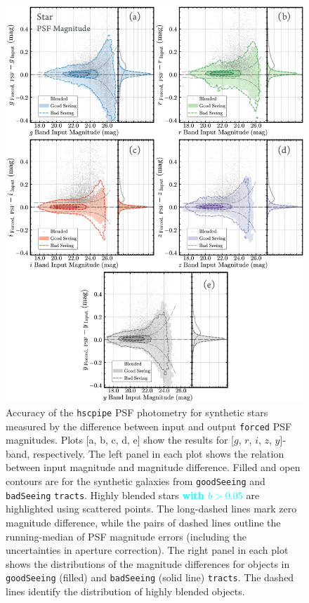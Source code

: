 \documentclass[useamsfonts]{pasj01}
\def\forced{\texttt{forced}}
\def\tracts{\texttt{tracts}}
\newcommand{\song}[1]{\textcolor{cyan} {\textbf{#1}}}
\begin{document}
\begin{figure}
    \begin{center}
        \includegraphics[width=16cm]{fig/synpipe_psf_mag}
    \end{center}
    \caption{
        Accuracy of the \texttt{hscpipe} PSF photometry for synthetic stars measured
        by the difference between input and output \forced{} PSF magnitudes.
        Plots [a, b, c, d, e] show the results for [$g$, $r$, $i$, $z$, $y$]-band, 
        respectively.
        The left panel in each plot shows the relation between input magnitude and
        magnitude difference.
        Filled and open contours are for the synthetic galaxies 
        from \texttt{goodSeeing} and \texttt{badSeeing} \tracts{}.
        Highly blended stars \song{with $b>0.05$} are highlighted using scattered 
        points.
        The long-dashed lines mark zero magnitude difference, while the pairs of
        dashed lines outline the running-median of PSF magnitude errors
        (including the uncertainties in aperture correction).
        The right panel in each plot shows the distributions of the magnitude 
        differences for objects in \texttt{goodSeeing} (filled) and \texttt{badSeeing}
        (solid line) \tracts{}.
        The dashed lines identify the distribution of highly blended objects.
        }
    \label{fig:psf_mag}
\end{figure}
\end{document}
